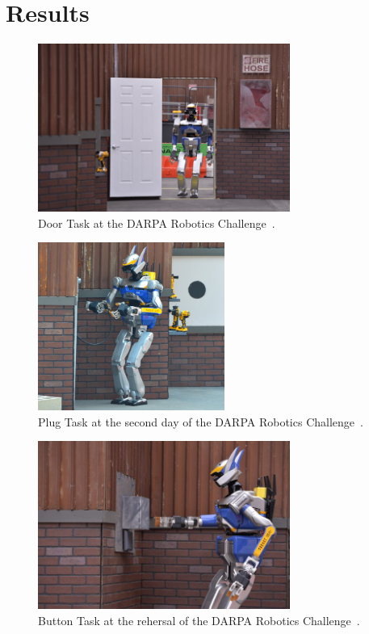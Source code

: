 \section{Results}
	\label{sec:results}
	
	\begin{figure}[t]
		\centering
		\includegraphics[height = 5.5cm]{img/door-drc}
		\caption{Door Task at the DARPA Robotics Challenge~\cite{DARPA}.}
		\label{fig:door-drc}
	\end{figure}
	
	\begin{figure}[b]
		\centering
		\includegraphics[height = 5.5cm]{img/plug-drc}
		\caption{Plug Task at the second day of the DARPA Robotics Challenge~\cite{Spectrum}.}
		\label{fig:plug-drc}
	\end{figure}
	
	\begin{figure}[t]
		\centering
		\includegraphics[height = 5.5cm]{img/button-drc}
		\caption{Button Task at the rehersal of the DARPA Robotics Challenge~\cite{DARPA}.}
		\label{fig:button-drc}
	\end{figure}